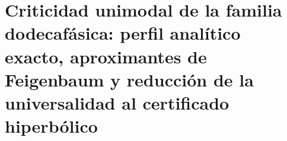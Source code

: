 \chapter{Criticidad unimodal de la familia dodecafásica: perfil analítico exacto, aproximantes de Feigenbaum y reducción de la universalidad al certificado hiperbólico}
\label{chap:p3-final:45:feigenbaum}



